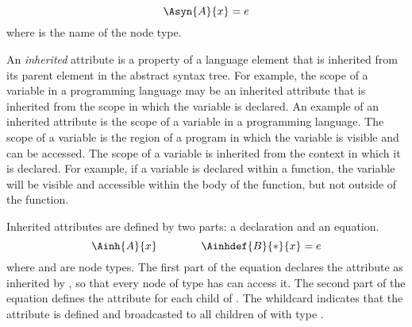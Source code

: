 \begin{equation*}
  \Asyn{A}{x} = e
  \end{equation*}
where  is the name of the node type.

An \emph{inherited} attribute is a property of a language element that is inherited from 
its parent element in the abstract syntax tree. For example, the scope of a variable 
in a programming language may be an inherited attribute that is inherited from the
scope in which the variable is declared.
An example of an inherited attribute is the scope of a variable in a programming 
language. The scope of a variable is the region of a program in which the variable 
is visible and can be accessed. The scope of a variable is inherited from the 
context in which it is declared. For example, if a variable is declared within a 
function, the variable will be visible and accessible within the body of the function, 
but not outside of the function.


Inherited attributes are defined by two parts: a declaration and an equation.
\begin{equation*}
\Ainh{A}{x} \quad\quad \quad\quad \Ainhdef{B}{*}{x} = e
\end{equation*}
where  and  are node types. 
The first part of the equation declares the attribute  as inherited by ,
so that every node of type  has can access it. The second part of the 
equation defines the attribute for each child of . The whildcard \astnode{*}
indicates that the attribute is defined and broadcasted to all children of  with type .

